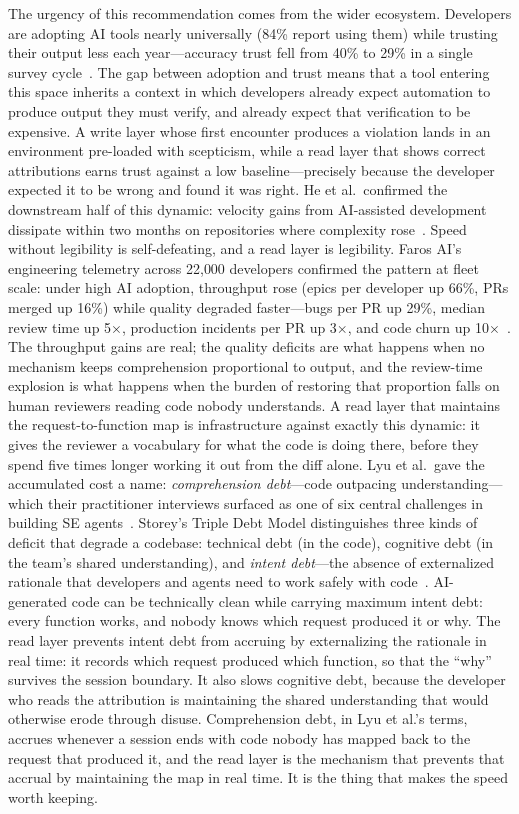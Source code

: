 The urgency of this recommendation comes from the wider ecosystem. Developers are
adopting AI tools nearly universally (84\% report using them) while trusting
their output less each year---accuracy trust fell from 40\% to 29\% in a single
survey cycle~\cite{stackoverflow2025}. The gap between adoption and trust means
that a tool entering this space inherits a context in which developers already
expect automation to produce output they must verify, and already expect that
verification to be expensive. A write layer whose first encounter produces a
violation lands in an environment pre-loaded with scepticism, while a read layer
that shows correct attributions earns trust against a low baseline---precisely
because the developer expected it to be wrong and found it was right. He et
al.\ confirmed the downstream half of this dynamic: velocity gains from
AI-assisted development dissipate within two months on repositories where
complexity rose~\cite{he2026}. Speed without legibility is self-defeating, and a
read layer is legibility. Faros AI's engineering telemetry across 22{,}000
developers confirmed the pattern at fleet scale: under high AI adoption,
throughput rose (epics per developer up 66\%, PRs merged up 16\%) while quality
degraded faster---bugs per PR up 29\%, median review time up
5$\times$, production incidents per PR up 3$\times$, and code churn up
10$\times$~\cite{faros2026whiplash}. The throughput gains are real; the quality
deficits are what happens when no mechanism keeps comprehension proportional to
output, and the review-time explosion is what happens when the burden of
restoring that proportion falls on human reviewers reading code nobody
understands. A read layer that maintains the request-to-function map is
infrastructure against exactly this dynamic: it gives the reviewer a vocabulary
for what the code is doing there, before they spend five times longer working it
out from the diff alone. Lyu et al.\ gave the accumulated cost a name:
\emph{comprehension debt}---code outpacing understanding---which their
practitioner interviews surfaced as one of six central challenges in building SE
agents~\cite{lyu2026practitioners}. Storey's Triple Debt Model distinguishes three kinds of deficit that degrade
a codebase: technical debt (in the code), cognitive debt (in the team's shared
understanding), and \emph{intent debt}---the absence of externalized rationale
that developers and agents need to work safely with
code~\cite{storey2026tripledebt}. AI-generated code can be technically clean
while carrying maximum intent debt: every function works, and nobody knows
which request produced it or why. The read layer prevents intent debt from
accruing by externalizing the rationale in real time: it records which request
produced which function, so that the ``why'' survives the session boundary. It
also slows cognitive debt, because the developer who reads the attribution is
maintaining the shared understanding that would otherwise erode through disuse.
Comprehension debt, in Lyu et al.'s terms, accrues whenever a session
ends with code nobody has mapped back to the request that produced it, and the
read layer is the mechanism that prevents that accrual by maintaining the map in
real time. It is the thing that makes the speed worth keeping.

